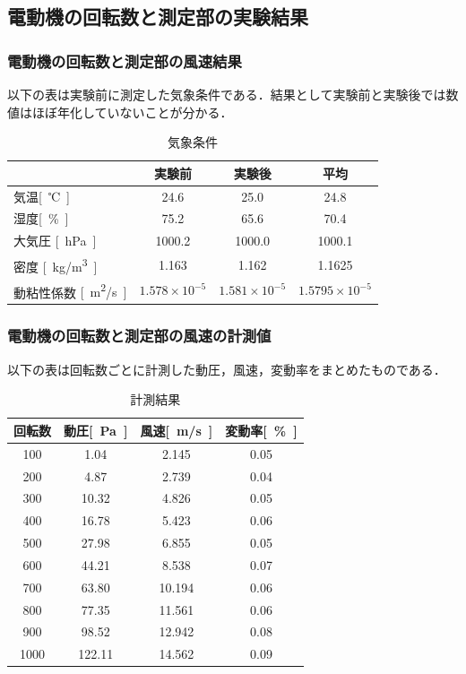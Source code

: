 \documentclass[a4paper,titlepage]{ltjsarticle}
\begin{document}
\subsection{電動機の回転数と測定部の実験結果}

\subsubsection{電動機の回転数と測定部の風速結果}
以下の表は実験前に測定した気象条件である．結果として実験前と実験後では数値はほぼ年化していないことが分かる．

\begin{table}[hbtp]
  \caption{気象条件}
  \centering
  \begin{tabular}{lccc}
    \toprule
    &実験前 & 実験後 & 平均\\
    \hline
    気温{\si{[℃]}} & 24.6 & 25.0 & 24.8\\
  湿度{\si{[\%]}} & 75.2 & 65.6 & 70.4\\
  大気圧 {\si{[hPa]}} & 1000.2 & 1000.0 & 1000.1\\
  密度 {\si{[kg/m^3]}}& 1.163 & 1.162 & 1.1625\\
  動粘性係数 {\si{[m^2/s]}} & $1.578\times10^{-5}$ & $1.581\times10^{-5}$ & $1.5795\times10^{-5}$\\
  \bottomrule
  \end{tabular}
\end{table}

\clearpage

\subsubsection{電動機の回転数と測定部の風速の計測値}
以下の表は回転数ごとに計測した動圧，風速，変動率をまとめたものである．

\begin{table}[hbtp]
  \caption{計測結果}
  \centering
  \begin{tabular}{cccc}
    \toprule
    回転数 & 動圧{\si{[Pa]}} & 風速{\si{[m/s]}} & 変動率{\si{[\%]}}\\
    \hline
    100 & 1.04 & 2.145 & 0.05\\
    200 & 4.87 & 2.739 & 0.04\\
    300 & 10.32 & 4.826 & 0.05\\
    400 & 16.78 & 5.423 & 0.06\\
    500 & 27.98 & 6.855 & 0.05\\
    600 & 44.21 & 8.538 & 0.07\\
    700 & 63.80 & 10.194 & 0.06\\
    800 & 77.35 & 11.561 & 0.06\\
    900 & 98.52 & 12.942 & 0.08\\
    1000 & 122.11 & 14.562 & 0.09\\
    \bottomrule
  \end{tabular}
\end{table}
\end{document}
